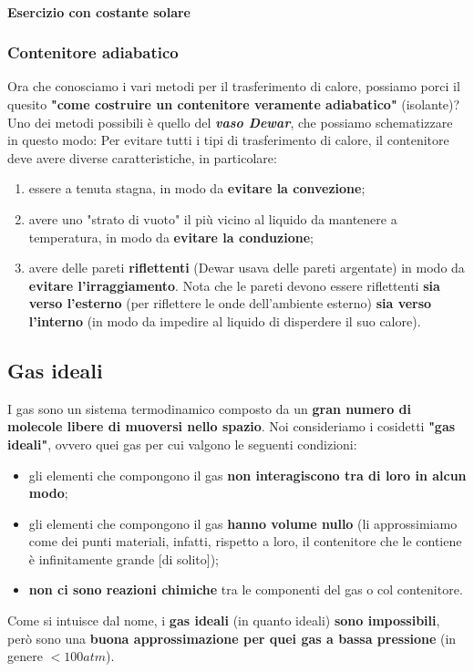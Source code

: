             \paragraph{Esercizio con costante solare}

        \subsubsection{Contenitore adiabatico}
            Ora che conosciamo i vari metodi per il trasferimento di calore, possiamo porci il quesito \textbf{"come costruire un contenitore veramente adiabatico"} (isolante)? Uno dei metodi possibili è quello del \textbf{\textit{vaso Dewar}}, che possiamo schematizzare in questo modo:
            Per evitare tutti i tipi di trasferimento di calore, il contenitore deve avere diverse caratteristiche, in particolare:
            \begin{enumerate}
                \item essere a tenuta stagna, in modo da \textbf{evitare la convezione};
                \item avere uno "strato di vuoto" il più vicino al liquido da mantenere a temperatura, in modo da \textbf{evitare la conduzione};
                \item avere delle pareti \textbf{riflettenti} (Dewar usava delle pareti argentate) in modo da \textbf{evitare l'irraggiamento}. Nota che le pareti devono essere riflettenti \textbf{sia verso l'esterno} (per riflettere le onde dell'ambiente esterno) \textbf{sia verso l'interno} (in modo da impedire al liquido di disperdere il suo calore).
            \end{enumerate}

    \subsection{Gas ideali}
        I gas sono un sistema termodinamico composto da un \textbf{gran numero di molecole libere di muoversi nello spazio}. Noi consideriamo i cosidetti \textbf{"gas ideali"}, ovvero quei gas per cui valgono le seguenti condizioni:
        \begin{itemize}
          \item gli elementi che compongono il gas \textbf{non interagiscono tra di loro in alcun modo};
          \item gli elementi che compongono il gas \textbf{hanno volume nullo} (li approssimiamo come dei punti materiali, infatti, rispetto a loro, il contenitore che le contiene è infinitamente grande [di solito]);
          \item \textbf{non ci sono reazioni chimiche} tra le componenti del gas o col contenitore.
        \end{itemize}
        Come si intuisce dal nome, i \textbf{gas ideali} (in quanto ideali) \textbf{sono impossibili}, però sono una \textbf{buona approssimazione per quei gas a bassa pressione} (in genere $< 100 atm$).

